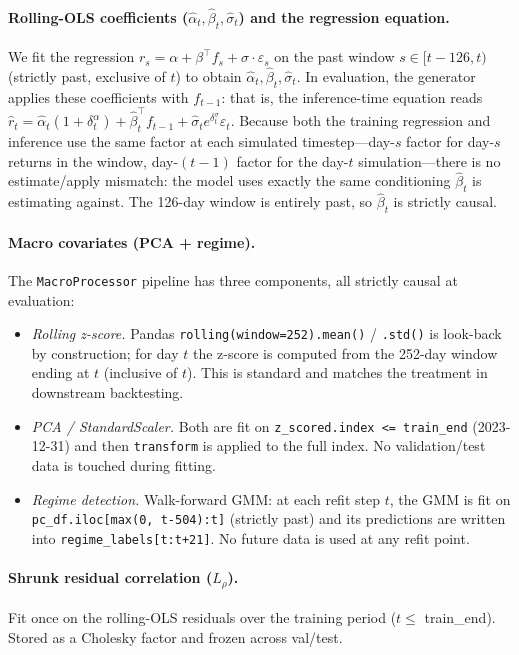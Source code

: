 \paragraph{Rolling-OLS coefficients ($\hat\alpha_t, \hat\beta_t, \hat\sigma_t$) and the regression equation.}
We fit the regression $r_s = \alpha + \beta^\top f_s + \sigma \cdot \varepsilon_s$ on the past window $s \in [t-126, t)$ (strictly past, exclusive of $t$) to obtain $\hat\alpha_t, \hat\beta_t, \hat\sigma_t$. In evaluation, the generator applies these coefficients with $f_{t-1}$: that is, the inference-time equation reads $\hat r_t = \hat\alpha_t (1 + \delta^\alpha_t) + \hat\beta_t^\top f_{t-1} + \hat\sigma_t e^{\delta^\sigma_t} \varepsilon_t$. Because both the training regression and inference use the same factor at each simulated timestep---day-$s$ factor for day-$s$ returns in the window, day-$(t-1)$ factor for the day-$t$ simulation---there is no estimate/apply mismatch: the model uses exactly the same conditioning $\hat\beta_t$ is estimating against. The 126-day window is entirely past, so $\hat\beta_t$ is strictly causal.

\paragraph{Macro covariates (PCA + regime).}
The \texttt{MacroProcessor} pipeline has three components, all strictly causal at evaluation:
\begin{itemize}
  \item \emph{Rolling z-score.} Pandas \texttt{rolling(window=252).mean()} / \texttt{.std()} is look-back by construction; for day $t$ the z-score is computed from the 252-day window ending at $t$ (inclusive of $t$). This is standard and matches the treatment in downstream backtesting.
  \item \emph{PCA / StandardScaler.} Both are fit on \texttt{z\_scored.index <= train\_end} (2023-12-31) and then \texttt{transform} is applied to the full index. No validation/test data is touched during fitting.
  \item \emph{Regime detection.} Walk-forward GMM: at each refit step $t$, the GMM is fit on \texttt{pc\_df.iloc[max(0, t-504):t]} (strictly past) and its predictions are written into \texttt{regime\_labels[t:t+21]}. No future data is used at any refit point.
\end{itemize}

\paragraph{Shrunk residual correlation ($L_\rho$).}
Fit once on the rolling-OLS residuals over the training period ($t \le $ train\_end). Stored as a Cholesky factor and frozen across val/test.

